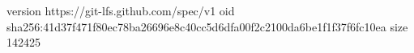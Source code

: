 version https://git-lfs.github.com/spec/v1
oid sha256:41d37f471f80ec78ba26696e8c40cc5d6dfa00f2c2100da6be1f1f37f6fc10ea
size 142425
